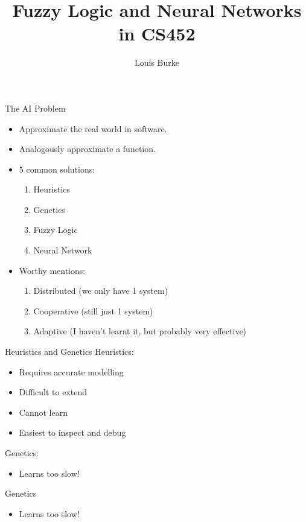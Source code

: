 \documentclass{beamer}
\title{Fuzzy Logic and Neural Networks in CS452}
\author{Louis Burke}
\begin{document}
\frame{\titlepage}

\begin{frame}{The AI Problem}
	\begin{itemize}
		\item Approximate the real world in software.
		\item Analogously approximate a function.
		\item 5 common solutions: \begin{enumerate}
			\item Heuristics
			\item Genetics
			\item Fuzzy Logic
			\item Neural Network
		\end{enumerate}
		\item Worthy mentions: \begin{enumerate}
			\item Distributed (we only have 1 system)
			\item Cooperative (still just 1 system)
			\item Adaptive (I haven't learnt it, but probably very effective)
		\end{enumerate}
	\end{itemize}
\end{frame}

\begin{frame}{Heuristics and Genetics}
	Heuristics:

	\begin{itemize}
		\item Requires accurate modelling
		\item Difficult to extend
		\item Cannot learn
		\item Easiest to inspect and debug
	\end{itemize}

	Genetics:

	\begin{itemize}
		\item Learns too slow!
	\end{itemize}
\end{frame}

\begin{frame}{Genetics}
	\begin{itemize}
		\item Learns too slow!
	\end{itemize}
\end{frame}
\end{document}
